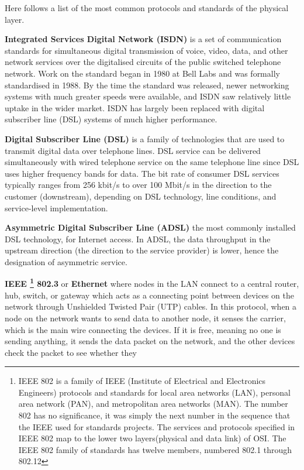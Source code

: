 Here follows a list of the most common protocols and standards of the physical layer.
\bit
\item \textbf{Integrated Services Digital Network (ISDN)} is a set of communication standards for simultaneous
digital transmission of voice, video, data, and other network services over the digitalised circuits of the public
switched telephone network. Work on the standard began in 1980 at Bell Labs and was formally standardised in 1988. By
the time the standard was released, newer networking systems with much greater speeds were available, and ISDN saw
relatively little uptake in the wider market. ISDN has largely been replaced with digital subscriber line (DSL)
systems of much higher performance.
\item \textbf{Digital Subscriber Line (DSL)} is a family of technologies that are used to transmit digital data over
telephone lines. DSL service can be delivered simultaneously with wired telephone service on the same telephone line
since DSL uses higher frequency bands for data. The bit rate of consumer DSL services typically ranges from 256
kbit/s to over 100 Mbit/s in the direction to the customer (downstream), depending on DSL technology, line
conditions, and service-level implementation.
\item \textbf{Asymmetric Digital Subscriber Line (ADSL)} the most commonly installed DSL technology, for Internet
access. In ADSL, the data throughput in the upstream direction (the direction to the service provider) is lower,
hence the designation of asymmetric service.
\item \textbf{IEEE \footnote{IEEE 802 is a family of IEEE (Institute of Electrical and Electronics Engineers) protocols
and standards for local area networks (LAN), personal area network (PAN), and metropolitan area networks (MAN). The
number 802 has no significance, it was simply the next number in the sequence that the IEEE used for standards projects.
The services and protocols specified in IEEE 802 map to the lower two layers(physical and data link) of OSI. The IEEE
802 family of standards has twelve members, numbered 802.1 through 802.12} 802.3} or \textbf{Ethernet} where nodes in
the LAN connect to a central router, hub, switch, or gateway which acts as a connecting point between devices on the
network through Unshielded Twisted Pair (UTP) cables. In this protocol, when a node on the network wants to send data to
another node, it senses the carrier, which is the main wire connecting the devices. If it is free, meaning no one is
sending anything, it sends the data packet on the network, and the other devices check the packet to see whether they
